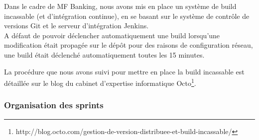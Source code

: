 Dans le cadre de MF Banking, nous avons mis en place un système de build incassable (et d'intégration continue), en se basant sur le système de contrôle de versions Git et le serveur d'intégration Jenkins.\\
A défaut de pouvoir déclencher automatiquement une build lorsqu'une modification était propagée sur le dépôt pour des raisons de configuration réseau, une build était déclenché automatiquement toutes les 15 minutes.

La procédure que nous avons suivi pour mettre en place la build incassable est détaillée sur le blog du cabinet d'expertise informatique Octo\footnote{http://blog.octo.com/gestion-de-version-distribuee-et-build-incassable/}.

\subsubsection{Organisation des sprints}

